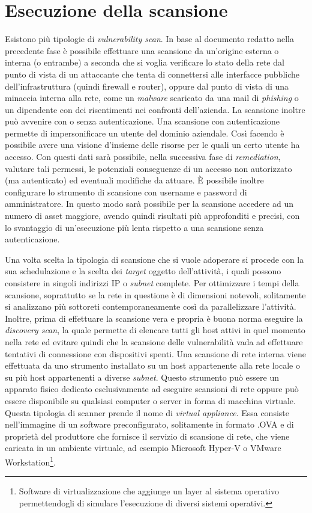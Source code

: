 \documentclass[target=mst,aauheader=]{thud}
\begin{document}
\section{Esecuzione della scansione}
Esistono più tipologie di \textit{vulnerability scan}. In base al documento redatto nella precedente fase è possibile effettuare una scansione da un’origine esterna o interna (o entrambe) a seconda che si voglia verificare lo stato della rete dal punto di vista di un attaccante che tenta di connettersi alle interfacce pubbliche dell’infrastruttura (quindi firewall e router), oppure dal punto di vista di una minaccia interna alla rete, come un \textit{malware} scaricato da una mail di \textit{phishing} o un dipendente con dei risentimenti nei confronti dell’azienda. La scansione inoltre può avvenire con o senza autenticazione. Una scansione con autenticazione permette di impersonificare un utente del dominio aziendale. Così facendo è possibile avere una visione d’insieme delle risorse per le quali un certo utente ha accesso. Con questi dati sarà possibile, nella successiva fase di \textit{remediation}, valutare tali permessi, le potenziali conseguenze di un accesso non autorizzato (ma autenticato) ed eventuali modifiche da attuare. È possibile inoltre configurare lo strumento di scansione con username e password di amministratore. In questo modo sarà possibile per la scansione accedere ad un numero di asset maggiore, avendo quindi risultati più approfonditi e precisi, con lo svantaggio di un’esecuzione più lenta rispetto a una scansione senza autenticazione.

Una volta scelta la tipologia di scansione che si vuole adoperare si procede con la sua schedulazione e la scelta dei \textit{target} oggetto dell’attività, i quali possono consistere in singoli indirizzi IP o \textit{subnet} complete. Per ottimizzare i tempi della scansione, soprattutto se la rete in questione è di dimensioni notevoli, solitamente si analizzano più sottoreti contemporaneamente così da parallelizzare l’attività. Inoltre, prima di effettuare la scansione vera e propria è buona norma eseguire la \textit{discovery scan}, la quale permette di elencare tutti gli host attivi in quel momento nella rete ed evitare quindi che la scansione delle vulnerabilità vada ad effettuare tentativi di connessione con dispositivi spenti.
Una scansione di rete interna viene effettuata da uno strumento installato su un host appartenente alla rete locale o su più host appartenenti a diverse \textit{subnet}. Questo strumento può essere un apparato fisico dedicato esclusivamente ad eseguire scansioni di rete oppure può essere disponibile su qualsiasi computer o server in forma di macchina virtuale. Questa tipologia di scanner prende il nome di \textit{virtual appliance}. Essa consiste nell’immagine di un software preconfigurato, solitamente in formato .OVA e di proprietà del produttore che fornisce il servizio di scansione di rete, che viene caricata in un ambiente virtuale, ad esempio Microsoft Hyper-V o VMware Workstation\footnote{Software di virtualizzazione che aggiunge un layer al sistema operativo permettendogli di simulare l’esecuzione di diversi sistemi operativi.}.
\end{document}
